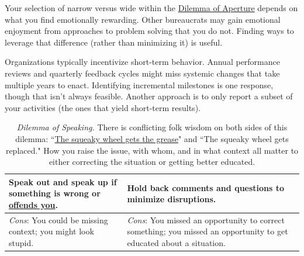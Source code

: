 Your selection of narrow versus wide within the \hyperref[table:focus-vs-systemic]{Dilemma of Aperture} depends on what you find emotionally rewarding. Other bureaucrats may gain emotional enjoyment from approaches to problem solving that you do not. Finding ways to leverage that difference (rather than minimizing it) is useful. 

Organizations typically incentivize short-term behavior. Annual performance reviews and quarterly feedback cycles might miss systemic changes that take multiple years to enact. Identifying incremental milestones is one response, though that isn't always feasible. Another approach is to only report a subset of your activities (the ones that yield short-term results). 

\begin{center}
\begin{table}[H] %
\begin{tabular}{ | m{\dilemmatablewidth}| m{\dilemmatablewidth} | } 
  \hline
  \textbf{Speak out and speak up if something is wrong or \href{https://en.wikipedia.org/wiki/Moral_injury}{offends you}.
  \index{Wikipedia!\href{https://en.wikipedia.org/wiki/Moral_injury}{moral injury}}
  } &
  \textbf{Hold back comments and questions to minimize disruptions.} \\
  \hline
  \textit{Cons}: You could be missing context; you might look stupid. & 
  \textit{Cons}: You missed an opportunity to correct something; you missed an opportunity to get educated about a situation. \\
  \hline
\end{tabular}
\caption{
\textit{Dilemma of Speaking.}
There is conflicting folk wisdom on both sides of this dilemma: 
``\href{https://en.wikipedia.org/wiki/The_squeaky_wheel_gets_the_grease}{The squeaky wheel gets the grease}" 
and 
``The squeaky wheel gets replaced." 
How you raise the issue, with whom, and in what context all matter to either correcting the situation or getting better educated.
}
\label{table:speak-up-or-hold-back}
\end{table}
\end{center}

